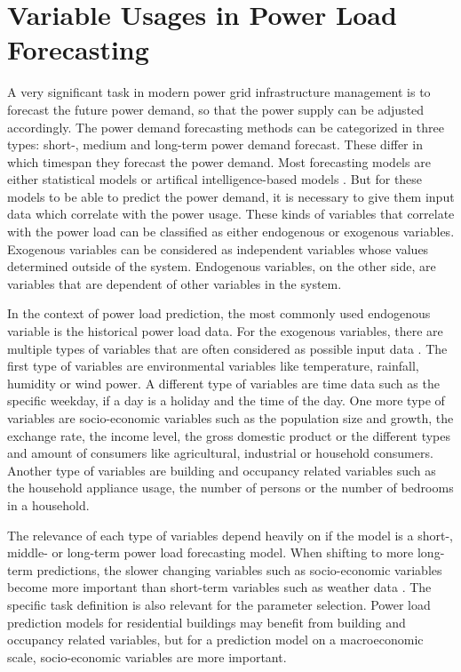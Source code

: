 \section{Variable Usages in Power Load Forecasting}
\label{powerloadsection}
A very significant task in modern power grid infrastructure management 
is to forecast
the future power demand, so that the power supply can be adjusted accordingly.
The power demand forecasting methods can be categorized in three types:
short-, medium and long-term power demand forecast. These differ in which
timespan they forecast the power demand. Most forecasting models are 
either statistical models or artifical intelligence-based models 
\cite{raza2015review}. But for these models to be able to predict the power 
demand, it is necessary to give them input data which correlate with the power 
usage. These kinds of variables that correlate with the power load 
can be classified as either endogenous or exogenous variables.
Exogenous variables can be considered as independent variables 
whose values determined outside of the system. 
Endogenous variables, on the other side, 
are variables that are dependent of other variables in the 
system.

In the context of power load prediction, the most commonly 
used endogenous variable is the historical power load data.
For the exogenous variables, there are multiple types of 
variables that are often considered as possible input data \cite{exogenousdata}
\cite{exogenousdata2}.
The first type of variables are environmental variables like temperature, 
rainfall, humidity or wind power. A different type of variables are time data
such as the specific weekday, if a day is a holiday and the time of the day.
One more type of variables are socio-economic variables such as the
population size and growth, the exchange rate, the income level,
the gross domestic product or the different types and amount 
of consumers like agricultural, industrial or household consumers.
Another type of variables are building and occupancy related variables such
as the household appliance usage,
the number of persons or the number of bedrooms in a household.

The relevance of each type of variables depend heavily on if the model is
a short-, middle- or long-term power load forecasting model. When shifting to more 
long-term predictions, the slower changing variables such as socio-economic
variables become more important than short-term variables such as weather data 
\cite{loadforecastingtimedependency2}\cite{loadforecastingtimedependency}.
The specific task definition is also relevant for the parameter selection.
Power load prediction models for residential buildings may benefit from 
building and occupancy related variables, but for a prediction model on a 
macroeconomic scale, socio-economic variables are more important.

